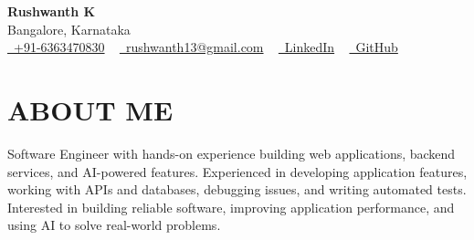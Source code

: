 \documentclass[letterpaper,11pt]{article}
\begin{document}

\begin{center}
{\Huge \textbf{Rushwanth K}}\\
Bangalore, Karnataka \\[6pt]
\small
\href{tel:+916363470830}{\faPhone\ +91-6363470830} ~
\href{mailto:rushwanth13@gmail.com}{\faEnvelope\ rushwanth13@gmail.com} ~
\href{https://www.linkedin.com/in/rushwanth-k-54a6a7200}{\faLinkedin\ LinkedIn} ~
\href{https://github.com/RushwanthK}{\faGithub\ GitHub}
\end{center}


\section{ABOUT ME}
\small{
Software Engineer with hands-on experience building web applications, backend services, and AI-powered features. Experienced in developing application features, working with APIs and databases, debugging issues, and writing automated tests. Interested in building reliable software, improving application performance, and using AI to solve real-world problems.
}

\end{document}
